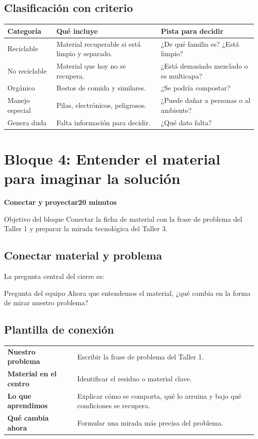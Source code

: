 \documentclass[10pt,a4paper]{article}
\newcommand{\blocktitle}[2]{%
  \vspace{2mm}
  {\large\bfseries\color{AIEPNavy}#1}\hfill{\small\bfseries\textcolor{AIEPRed}{#2}}\par
  \vspace{1mm}
}
\begin{document}
\subsection{Clasificación con criterio}
\begin{tabularx}{\textwidth}{@{}p{35mm}Y Y@{}}
\textbf{\color{AIEPNavy}Categoría} & \textbf{\color{AIEPNavy}Qué incluye} & \textbf{\color{AIEPNavy}Pista para decidir} \\
\hline
Reciclable & Material recuperable si está limpio y separado. & ¿De qué familia es? ¿Está limpio? \\
No reciclable & Material que hoy no se recupera. & ¿Está demasiado mezclado o es multicapa? \\
Orgánico & Restos de comida y similares. & ¿Se podría compostar? \\
Manejo especial & Pilas, electrónicos, peligrosos. & ¿Puede dañar a personas o al ambiente? \\
Genera duda & Falta información para decidir. & ¿Qué dato falta? \\
\end{tabularx}

\newpage
\section{Bloque 4: Entender el material para imaginar la solución}
\blocktitle{Conectar y proyectar}{20 minutos}

\begin{infobox}{Objetivo del bloque}
Conectar la ficha de material con la frase de problema del Taller 1 y preparar la mirada tecnológica del Taller 3.
\end{infobox}

\subsection{Conectar material y problema}
La pregunta central del cierre es:

\begin{keybox}{Pregunta del equipo}
Ahora que entendemos el material, ¿qué cambia en la forma de mirar nuestro problema?
\end{keybox}

\subsection{Plantilla de conexión}
\begin{tabularx}{\textwidth}{@{}>{\bfseries\color{AIEPNavy}}p{48mm}Y@{}}
Nuestro problema & Escribir la frase de problema del Taller 1. \\
Material en el centro & Identificar el residuo o material clave. \\
Lo que aprendimos & Explicar cómo se comporta, qué lo arruina y bajo qué condiciones se recupera. \\
Qué cambia ahora & Formular una mirada más precisa del problema. \\
\end{tabularx}
\end{document}
